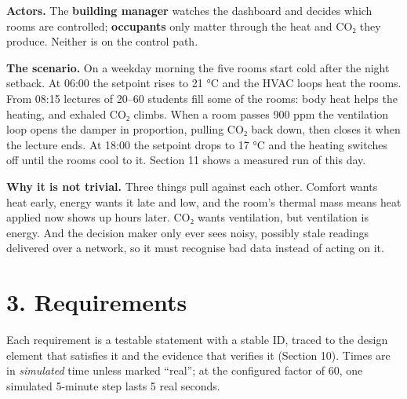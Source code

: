 \documentclass[11pt]{article}
\makeatletter
\DeclareRobustCommand{\_}{\ifmmode\nfss@text{\textunderscore}\else\textunderscore\allowbreak\fi}
\makeatother
\begin{document}
\textbf{Actors.} The \textbf{building manager} watches the dashboard and decides
which rooms are controlled; \textbf{occupants} only matter through the heat and
CO₂ they produce. Neither is on the control path.

\textbf{The scenario.} On a weekday morning the five rooms start cold after the
night setback. At 06:00 the setpoint rises to 21 °C and the HVAC loops heat the
rooms. From 08:15 lectures of 20–60 students fill some of the rooms: body heat
helps the heating, and exhaled CO₂ climbs. When a room passes 900 ppm the
ventilation loop opens the damper in proportion, pulling CO₂ back down, then
closes it when the lecture ends. At 18:00 the setpoint drops to 17 °C and the
heating switches off until the rooms cool to it. Section 11 shows a measured run
of this day.

\textbf{Why it is not trivial.} Three things pull against each other. Comfort
wants heat early, energy wants it late and low, and the room's thermal mass means
heat applied now shows up hours later. CO₂ wants ventilation, but ventilation is
energy. And the decision maker only ever sees noisy, possibly stale readings
delivered over a network, so it must recognise bad data instead of acting on it.

\section{3. Requirements}

Each requirement is a testable statement with a stable ID, traced to the design
element that satisfies it and the evidence that verifies it (Section 10). Times are
in \emph{simulated} time unless marked ``real''; at the configured factor of 60,
one simulated 5-minute step lasts 5 real seconds.
\end{document}
